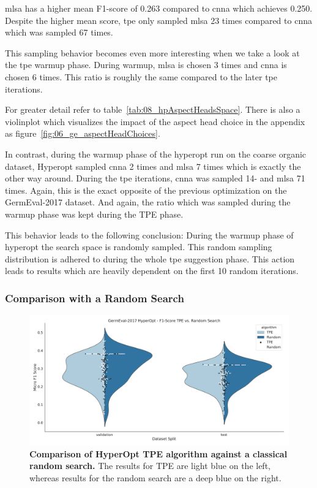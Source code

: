 \gls{mlsa} has a higher mean F1-score of 0.263 compared to \gls{cnna} which achieves 0.250. Despite the higher mean score, \gls{tpe} only sampled \gls{mlsa} 23 times compared to \gls{cnna} which was sampled 67 times.

This sampling behavior becomes even more interesting when we take a look at the \gls{tpe} warmup phase. During warmup, \gls{mlsa} is chosen 3 times and \gls{cnna} is chosen 6 times. This ratio is roughly the same compared to the later \gls{tpe} iterations. 

For greater detail refer to table~\ref{tab:08_hpAspectHeadsSpace}. There is also a violinplot which visualizes the impact of the aspect head choice in the appendix as figure~\ref{fig:06_ge_aspectHeadChoices}.
\medskip

In contrast, during the warmup phase of the hyperopt run on the coarse organic dataset, Hyperopt sampled \gls{cnna} 2 times and \gls{mlsa} 7 times which is exactly the other way around. During the \gls{tpe} iterations, \gls{cnna} was sampled 14- and \gls{mlsa} 71 times. Again, this is the exact opposite of the previous optimization on the GermEval-2017 dataset. And again, the ratio which was sampled during the warmup phase was kept during the TPE phase.
\medskip

This behavior leads to the following conclusion: During the warmup phase of hyperopt the search space is randomly sampled. This random sampling distribution is adhered to during the whole \gls{tpe} suggestion phase. This action leads to results which are heavily dependent on the first 10 random iterations.

\subsubsection*{Comparison with a Random Search}

\begin{figure}[ht]
    \centering
    \includegraphics[width=\textwidth]{figures/06_results/06_hp_ge_vio_tpeRand}
    \caption{\textbf{Comparison of HyperOpt TPE algorithm against a classical random search.} The results for TPE are light blue on the left, whereas results for the random search are a deep blue on the right.}
    \label{fig:06_HpOptimTpe_Rand}
\end{figure}

